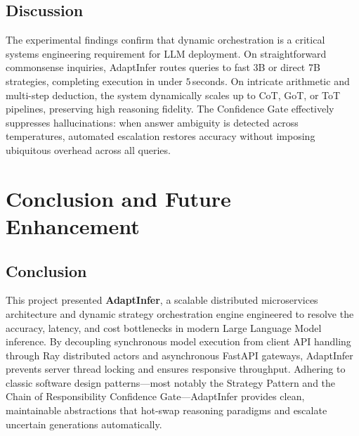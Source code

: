 \documentclass[12pt,a4paper]{report}
\begin{document}
\section{Discussion}
\label{sec:discussion}
The experimental findings confirm that dynamic orchestration is a critical systems engineering requirement for LLM deployment. On straightforward commonsense inquiries, AdaptInfer routes queries to fast 3B or direct 7B strategies, completing execution in under $5$\,seconds. On intricate arithmetic and multi-step deduction, the system dynamically scales up to CoT, GoT, or ToT pipelines, preserving high reasoning fidelity. The Confidence Gate effectively suppresses hallucinations: when answer ambiguity is detected across temperatures, automated escalation restores accuracy without imposing ubiquitous overhead across all queries.

\chapter{Conclusion and Future Enhancement}
\label{ch:conclusion}

\section{Conclusion}
\label{sec:conclusion_text}
This project presented \textbf{AdaptInfer}, a scalable distributed microservices architecture and dynamic strategy orchestration engine engineered to resolve the accuracy, latency, and cost bottlenecks in modern Large Language Model inference. By decoupling synchronous model execution from client API handling through Ray distributed actors and asynchronous FastAPI gateways, AdaptInfer prevents server thread locking and ensures responsive throughput. Adhering to classic software design patterns—most notably the Strategy Pattern and the Chain of Responsibility Confidence Gate—AdaptInfer provides clean, maintainable abstractions that hot-swap reasoning paradigms and escalate uncertain generations automatically.
\end{document}

